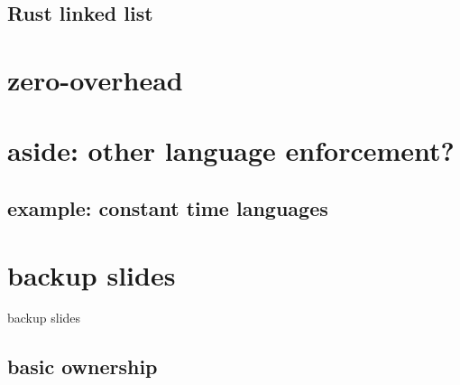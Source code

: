\subsection{Rust linked list}


\section{zero-overhead}


\section{aside: other language enforcement?}


\subsection{example: constant time languages}




\section{backup slides}
\begin{frame}{backup slides}
\end{frame}
\subsection{basic ownership}



